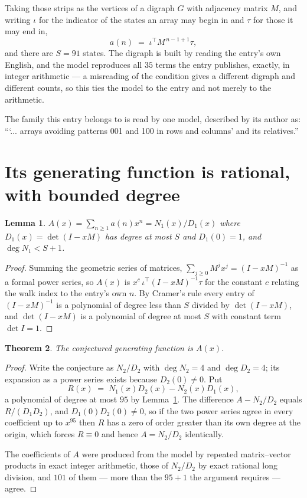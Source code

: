 \documentclass[11pt,a4paper]{article}
\theoremstyle{plain}
\newtheorem{theorem}{Theorem}
\newtheorem{lemma}[theorem]{Lemma}
\theoremstyle{definition}
\begin{document}
Taking those strips as the vertices of a digraph $G$ with adjacency matrix $M$, and writing
$\iota$ for the indicator of the states an array may begin in and $\tau$ for those it may end
in,
\[
a(n)\;=\;\iota^{\!\top}M^{\,n-1+1}\tau ,
\]
and there are $S=91$ states. The digraph is built by reading the entry's own English, and the
model reproduces all $35$ terms the entry publishes, exactly, in integer arithmetic --- a
misreading of the condition gives a different digraph and different counts, so this ties the
model to the entry and not merely to the arithmetic.

The family this entry belongs to is read by one model, described by its author as: ```... arrays avoiding patterns 001 and 100 in rows and columns' and its relatives.''


\section{Its generating function is rational, with bounded degree}

\begin{lemma}\label{lem:rat}
$A(x)=\sum_{n\ge1}a(n)x^n=N_1(x)/D_1(x)$ where $D_1(x)=\det(I-xM)$ has degree at most
$S$ and $D_1(0)=1$, and $\deg N_1<S+1$.
\end{lemma}

\begin{proof}
Summing the geometric series of matrices, $\sum_{j\ge0}M^jx^j=(I-xM)^{-1}$ as a formal
power series, so $A(x)$ is $x^{c}\,\iota^{\!\top}(I-xM)^{-1}\tau$ for the constant $c$
relating the walk index to the entry's own $n$. By Cramer's rule every entry of
$(I-xM)^{-1}$ is a polynomial of degree less than $S$ divided by $\det(I-xM)$, and
$\det(I-xM)$ is a polynomial of degree at most $S$ with constant term $\det I=1$.
\end{proof}

\begin{theorem}
The conjectured generating function is $A(x)$.
\end{theorem}

\begin{proof}
Write the conjecture as $N_2/D_2$ with $\deg N_2=4$ and $\deg D_2=4$; its expansion as a
power series exists because $D_2(0)\neq0$. Put
\[
R(x)\;=\;N_1(x)D_2(x)-N_2(x)D_1(x),
\]
a polynomial of degree at most $95$ by Lemma~\ref{lem:rat}. The difference
$A-N_2/D_2$ equals $R/(D_1D_2)$, and $D_1(0)D_2(0)\neq0$, so if the two power series agree in
every coefficient up to $x^{95}$ then $R$ has a zero of order greater than its own
degree at the origin, which forces $R\equiv0$ and hence $A=N_2/D_2$ identically.

The coefficients of $A$ were produced from the model by repeated matrix--vector products in
exact integer arithmetic, those of $N_2/D_2$ by exact rational long division, and $101$
of them --- more than the $95+1$ the argument requires --- agree.
\end{proof}
\end{document}

